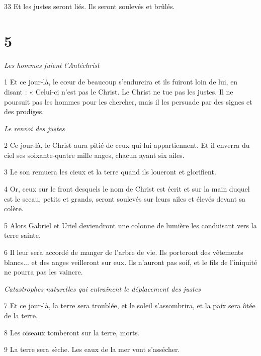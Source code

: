 \par 33 Et les justes seront liés. Ils seront soulevés et brûlés.

\chapter{5}

\par \textit{Les hommes fuient l'Antéchrist}

\par 1 Et ce jour-là, le cœur de beaucoup s'endurcira et ils fuiront loin de lui, en disant : « Celui-ci n'est pas le Christ. Le Christ ne tue pas les justes. Il ne poursuit pas les hommes pour les chercher, mais il les persuade par des signes et des prodiges.

\par \textit{Le renvoi des justes}

\par 2 Ce jour-là, le Christ aura pitié de ceux qui lui appartiennent. Et il enverra du ciel ses soixante-quatre mille anges, chacun ayant six ailes.

\par 3 Le son remuera les cieux et la terre quand ils loueront et glorifient.

\par 4 Or, ceux sur le front desquels le nom de Christ est écrit et sur la main duquel est le sceau, petits et grands, seront soulevés sur leurs ailes et élevés devant sa colère.

\par 5 Alors Gabriel et Uriel deviendront une colonne de lumière les conduisant vers la terre sainte.

\par 6 Il leur sera accordé de manger de l'arbre de vie. Ils porteront des vêtements blancs... et des anges veilleront sur eux. Ils n’auront pas soif, et le fils de l’iniquité ne pourra pas les vaincre.

\par \textit{Catastrophes naturelles qui entraînent le déplacement des justes}

\par 7 Et ce jour-là, la terre sera troublée, et le soleil s'assombrira, et la paix sera ôtée de la terre.

\par 8 Les oiseaux tomberont sur la terre, morts.

\par 9 La terre sera sèche. Les eaux de la mer vont s'assécher.

